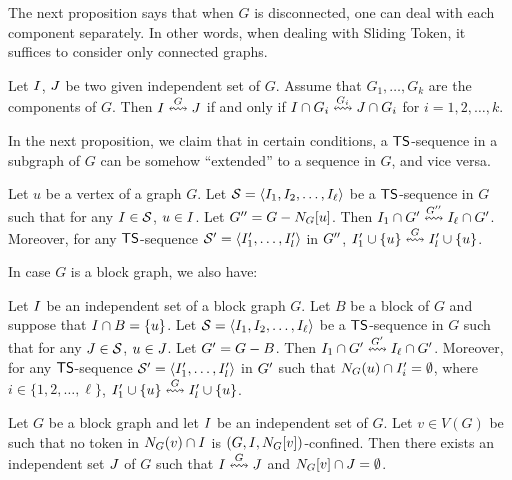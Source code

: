 \documentclass[a4paper]{llncs}
\begin{document}
The next proposition says that when $G$ is disconnected, one can deal with each component separately. In other words, when dealing with {\sc Sliding Token}, it suffices to consider only connected graphs.


\begin{proposition}
\label{prop:TS-in-each-compoenent}
Let $I$, $J$ be two given independent set of $G$.
Assume that $G_1, \dots, G_k$ are the components of $G$. 
Then $I \overset{G}{\leftrightsquigarrow} J$ if and only if $I \cap G_i \overset{G_i}{\leftrightsquigarrow} J \cap G_i$ for $i = 1, 2, \dots, k$.
\end{proposition}


In the next proposition, we claim that in certain conditions, a ${\sf TS}$-sequence in a subgraph of $G$ can be somehow ``extended'' to a sequence in $G$, and vice versa.


\begin{proposition}
\label{prop:TS-in-subgraphs}
Let $u$ be a vertex of a graph $G$.
Let ${\cal S} = \langle I_1, I_2, \dots, I_\ell \rangle$ be a ${\sf TS}$-sequence in $G$ such that for any $I \in {\cal S}$, $u \in I$.
Let $G^{\prime\prime} = G - N_{G}[u]$.
Then $I_1 \cap {G^\prime} \overset{G^{\prime\prime}}{\leftrightsquigarrow} I_\ell \cap {G^\prime}$.
Moreover, for any ${\sf TS}$-sequence ${{\cal S}^\prime} = \langle I^{\prime}_1, \dots, I^{\prime}_l \rangle$ in $G^{\prime\prime}$, $I^{\prime}_1 \cup \{u\} \overset{G}{\leftrightsquigarrow} I^{\prime}_l \cup \{u\}$.
\end{proposition}


In case $G$ is a block graph, we also have:


\begin{proposition}
\label{prop:TS-in-subgraphs-blockgraph}
Let $I$ be an independent set of a block graph $G$.
Let $B$ be a block of $G$ and suppose that $I \cap B = \{u\}$.
Let ${\cal S} = \langle I_1, I_2, \dots, I_\ell \rangle$ be a ${\sf TS}$-sequence in $G$ such that for any $J \in {\cal S}$, $u \in J$.
Let ${G^\prime} = G - B$.
Then $I_1 \cap {G^\prime} \overset{{G^\prime}}{\leftrightsquigarrow} I_\ell \cap {G^\prime}$.
Moreover, for any ${\sf TS}$-sequence ${{\cal S}^\prime} = \langle I^{\prime}_1, \dots, I^{\prime}_l \rangle$ in ${G^\prime}$ such that $N_{G}(u) \cap I^{\prime}_i = \emptyset$, where $i \in \{1, 2, \dots, \ell\}$, $I^{\prime}_1 \cup \{u\} \overset{G}{\leftrightsquigarrow} I^{\prime}_l \cup \{u\}$.
\end{proposition}



\begin{proposition}
\label{prop:every-token-is-not-confined}
Let $G$ be a block graph and let $I$ be an independent set of $G$.
Let $v \in V(G)$ be such that no token in $N_{G}(v) \cap I$ is $(G, I, N_{G}[v])$-confined.
Then there exists an independent set $J$ of $G$ such that $I \overset{G}{\leftrightsquigarrow} J$ and $N_{G}[v] \cap J = \emptyset$.
\end{proposition}
\end{document}
